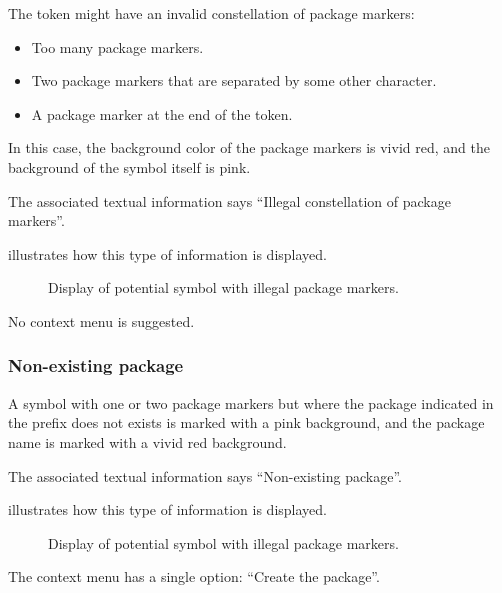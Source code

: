 The token might have an invalid constellation of package markers:

\begin{itemize}
\item Too many package markers.
\item Two package markers that are separated by some other character. 
\item A package marker at the end of the token.
\end{itemize}

In this case, the background color of the package markers is vivid
red, and the background of the symbol itself is pink. 

The associated textual information says ``Illegal constellation of
package markers''. 

 illustrates how this type of
information is displayed.

\begin{figure}
\begin{center}
\end{center}
\caption{\label{fig-invalid-package-markers}
Display of potential symbol with illegal package markers.}
\end{figure}

No context menu is suggested. 

\subsubsection{Non-existing package}

A symbol with one or two package markers but where the package
indicated in the prefix does not exists is marked with a pink
background, and the package name is marked with a vivid red
background. 

The associated textual information says ``Non-existing package''.

 illustrates how this type of
information is displayed.

\begin{figure}
\begin{center}
\end{center}
\caption{\label{fig-non-existing-package}
Display of potential symbol with illegal package markers.}
\end{figure}

The context menu has a single option: ``Create the package''.

